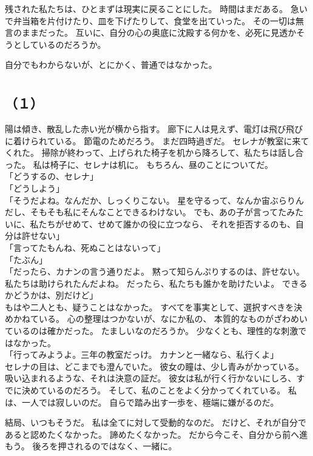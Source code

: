 \documentclass[../IHMain]{subfiles}
\begin{document}
残された私たちは、ひとまずは現実に戻ることにした。
時間はまだある。
急いで弁当箱を片付けたり、皿を下げたりして、食堂を出ていった。
その一切は無言のままだった。
互いに、自分の心の奥底に沈殿する何かを、必死に見透かそうとしているのだろうか。

自分でもわからないが、とにかく、普通ではなかった。

\section{}
\subsection*{（１）}
陽は傾き、散乱した赤い光が横から指す。
廊下に人は見えず、電灯は飛び飛びに着けられている。
節電のためだろう。
まだ四時過ぎだ。
セレナが教室に来てくれた。
掃除が終わって、上げられた椅子を机から降ろして、私たちは話し合った。
私は椅子に、セレナは机に。
もちろん、昼のことについてだ。\\
「どうするの、セレナ」\\
「どうしよう」\\
「そうだよね。なんだか、しっくりこない。
星を守るって、なんか宙ぶらりんだし、そもそも私にそんなことできるわけない。
でも、あの子が言ってたみたいに、私たちがせめて、せめて誰かの役に立つなら、
それを拒否するのも、自分は許せない」\\
「言ってたもんね、死ぬことはないって」\\
「たぶん」\\
「だったら、カナンの言う通りだよ。
黙って知らんぷりするのは、許せない。
私たちは助けられたんだよね。
だったら、私たちも誰かを助けたいよ。
できるかどうかは、別だけど」\\
もはや二人とも、疑うことはなかった。
すべてを事実として、選択すべきを決めかねている。
心の整理はつかないが、なにか私の、
本質的なものがざわめいているのは確かだった。
たましいなのだろうか。
少なくとも、理性的な刺激ではなかった。\\
「行ってみようよ。三年の教室だっけ。
カナンと一緒なら、私行くよ」\\
セレナの目は、どこまでも澄んでいた。
彼女の瞳は、少し青みがかっている。
吸い込まれるような、それは決意の証だ。
彼女は私が行く行かないにしろ、すでに決めているのだろう。
そして、私のことをよく分かってくれている。
私は、一人では寂しいのだ。
自らで踏み出す一歩を、極端に嫌がるのだ。

結局、いつもそうだ。
私は全てに対して受動的なのだ。
だけど、それが自分であると認めたくなかった。
諦めたくなかった。
だから今こそ、自分から前へ進もう。
後ろを押されるのではなく、一緒に。
\end{document}
